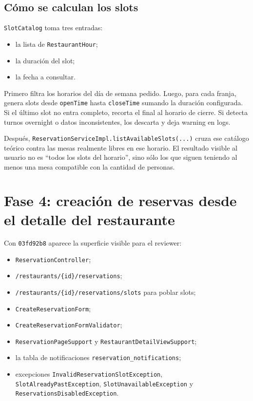 \documentclass[11pt,a4paper]{report}
\newcommand{\commit}[1]{\texttt{#1}}
\newcommand{\code}[1]{\nolinkurl{#1}}
\begin{document}
\subsection{C\'omo se calculan los slots}

\code{SlotCatalog} toma tres entradas:

\begin{itemize}
  \item la lista de \code{RestaurantHour};
  \item la duraci\'on del slot;
  \item la fecha a consultar.
\end{itemize}

Primero filtra los horarios del d\'ia de semana pedido. Luego, para cada franja, genera slots desde \code{openTime} hasta \code{closeTime} sumando la duraci\'on configurada. Si el \'ultimo slot no entra completo, recorta el final al horario de cierre. Si detecta turnos overnight o datos inconsistentes, los descarta y deja warning en logs.

Despu\'es, \code{ReservationServiceImpl.listAvailableSlots(...)} cruza ese cat\'alogo te\'orico contra las mesas realmente libres en ese horario. El resultado visible al usuario no es ``todos los slots del horario'', sino s\'olo los que siguen teniendo al menos una mesa compatible con la cantidad de personas.

\section{Fase 4: creaci\'on de reservas desde el detalle del restaurante}

Con \commit{03fd92b8} aparece la superficie visible para el reviewer:

\begin{itemize}
  \item \code{ReservationController};
  \item \code{/restaurants/\{id\}/reservations};
  \item \code{/restaurants/\{id\}/reservations/slots} para poblar slots;
  \item \code{CreateReservationForm};
  \item \code{CreateReservationFormValidator};
  \item \code{ReservationPageSupport} y \code{RestaurantDetailViewSupport};
  \item la tabla de notificaciones \code{reservation\_notifications};
  \item excepciones \code{InvalidReservationSlotException}, \code{SlotAlreadyPastException}, \code{SlotUnavailableException} y \code{ReservationsDisabledException}.
\end{itemize}
\end{document}
